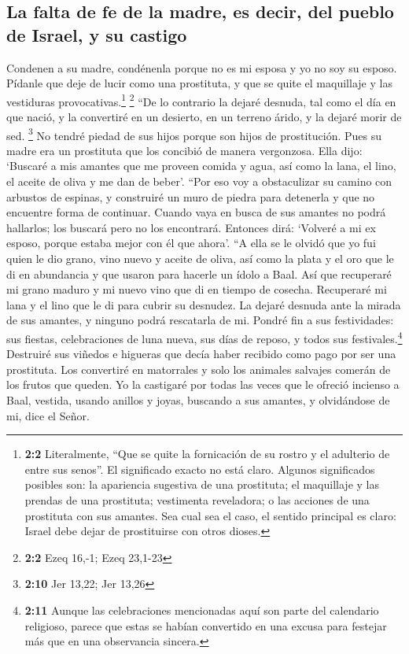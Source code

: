 \hypertarget{la-falta-de-fe-de-la-madre-es-decir-del-pueblo-de-israel-y-su-castigo}{%
\subsection{La falta de fe de la madre, es decir, del pueblo de Israel,
y su
castigo}\label{la-falta-de-fe-de-la-madre-es-decir-del-pueblo-de-israel-y-su-castigo}}

 Condenen a su madre, condénenla porque no es mi esposa y
yo no soy su esposo. Pídanle que deje de lucir como una prostituta, y
que se quite el maquillaje y las vestiduras provocativas.\footnote{\textbf{2:2}
  Literalmente, ``Que se quite la fornicación de su rostro y el
  adulterio de entre sus senos''. El significado exacto no está claro.
  Algunos significados posibles son: la apariencia sugestiva de una
  prostituta; el maquillaje y las prendas de una prostituta; vestimenta
  reveladora; o las acciones de una prostituta con sus amantes. Sea cual
  sea el caso, el sentido principal es claro: Israel debe dejar de
  prostituirse con otros dioses.} \footnote{\textbf{2:2} Ezeq 16,-1;
  Ezeq 23,1-23}  ``De lo contrario la dejaré desnuda, tal
como el día en que nació, y la convertiré en un desierto, en un terreno
árido, y la dejaré morir de sed. \footnote{\textbf{2:10} Jer 13,22; Jer
  13,26}  No tendré piedad de sus hijos porque son hijos
de prostitución.  Pues su madre era un prostituta que los
concibió de manera vergonzosa. Ella dijo: `Buscaré a mis amantes que me
proveen comida y agua, así como la lana, el lino, el aceite de oliva y
me dan de beber'.  ``Por eso voy a obstaculizar su camino
con arbustos de espinas, y construiré un muro de piedra para detenerla y
que no encuentre forma de continuar.  Cuando vaya en busca
de sus amantes no podrá hallarlos; los buscará pero no los encontrará.
Entonces dirá: `Volveré a mi ex esposo, porque estaba mejor con él que
ahora'.  ``A ella se le olvidó que yo fui quien le dio
grano, vino nuevo y aceite de oliva, así como la plata y el oro que le
di en abundancia y que usaron para hacerle un ídolo a Baal.
 Así que recuperaré mi grano maduro y mi nuevo vino que di
en tiempo de cosecha. Recuperaré mi lana y el lino que le di para cubrir
su desnudez.  La dejaré desnuda ante la mirada de sus
amantes, y ninguno podrá rescatarla de mi.  Pondré fin a
sus festividades: sus fiestas, celebraciones de luna nueva, sus días de
reposo, y todos sus festivales.\footnote{\textbf{2:11} Aunque las
  celebraciones mencionadas aquí son parte del calendario religioso,
  parece que estas se habían convertido en una excusa para festejar más
  que en una observancia sincera.}  Destruiré sus viñedos
e higueras que decía haber recibido como pago por ser una prostituta.
Los convertiré en matorrales y solo los animales salvajes comerán de los
frutos que queden.  Yo la castigaré por todas las veces
que le ofreció incienso a Baal, vestida, usando anillos y joyas,
buscando a sus amantes, y olvidándose de mi, dice el Señor.

